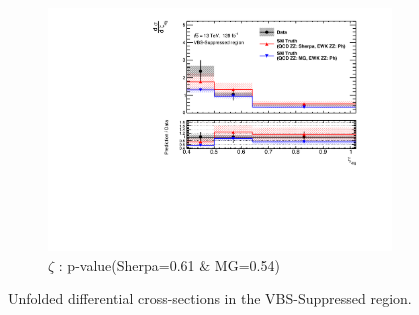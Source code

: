 \begin{figure}[!htb]
\begin{subfigure}{.49\textwidth}
        \includegraphics[width=.98\linewidth]{figures/Results/CrossSection_VBSSuppressed/xs_centrality_CR.pdf}
        \caption{ \footnotesize{$\zeta$ }: p-value(Sherpa=0.61 $\&$ MG=0.54)}
    \end{subfigure}
    \caption{Unfolded differential cross-sections in the VBS-Suppressed region.}  \label{fig:unfolded_xs_VBS_Suppressed_b}
\end{figure}
